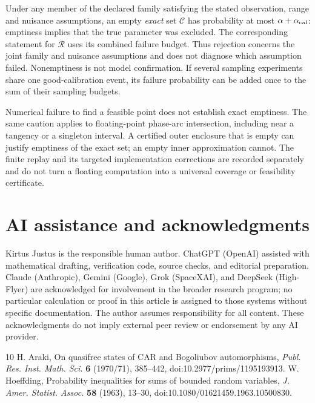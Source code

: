 \documentclass[11pt]{article}
\theoremstyle{definition}
\begin{document}
Under any member of the declared family satisfying the stated observation,
range and nuisance assumptions, an empty \emph{exact} set $\mathcal C$
has probability at most $\alpha+\alpha_{\rm cal}$: emptiness implies that the true
parameter was excluded. The corresponding statement for $\mathcal R$
uses its combined failure budget. Thus rejection concerns the joint family
and nuisance assumptions and does not diagnose which assumption failed.
Nonemptiness is not model confirmation. If several sampling experiments
share one good-calibration event, its failure probability can be added once
to the sum of their sampling budgets.

Numerical failure to find a feasible point does not establish exact emptiness.
The same caution applies to floating-point phase-arc intersection, including
near a tangency or a singleton interval. A certified outer enclosure that is
empty can justify emptiness of the exact set; an empty inner approximation
cannot. The finite replay and its targeted implementation corrections are
recorded separately and do not turn a floating computation into a universal
coverage or feasibility certificate.

\section*{AI assistance and acknowledgments}
Kirtus Justus is the responsible human author. ChatGPT (OpenAI) assisted with mathematical drafting, verification code, source checks, and editorial preparation. Claude (Anthropic), Gemini (Google), Grok (SpaceXAI), and DeepSeek (High-Flyer) are acknowledged for involvement in the broader research program; no particular calculation or proof in this article is assigned to those systems without specific documentation. The author assumes responsibility for all content. These acknowledgments do not imply external peer review or endorsement by any AI provider.

\begin{thebibliography}{10}
 H. Araki, On quasifree states of CAR and Bogoliubov automorphisms, \emph{Publ. Res. Inst. Math. Sci.} \textbf{6} (1970/71), 385--442, doi:10.2977/prims/1195193913.
 W. Hoeffding, Probability inequalities for sums of bounded random variables, \emph{J. Amer. Statist. Assoc.} \textbf{58} (1963), 13--30, doi:10.1080/01621459.1963.10500830.
\end{thebibliography}
\end{document}

